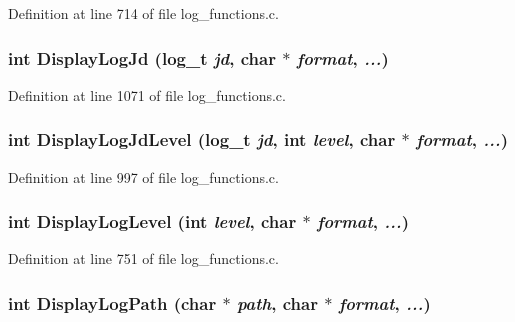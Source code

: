 Definition at line 714 of file log\_\-functions.c.
\subsubsection[{DisplayLogJd}]{\setlength{\rightskip}{0pt plus 5cm}int DisplayLogJd (log\_\-t {\em jd}, \/  char $\ast$ {\em format}, \/   {\em ...})}\label{log__functions_8c_cf6761c8fc977facc43ff1f3681801ab}




Definition at line 1071 of file log\_\-functions.c.
\subsubsection[{DisplayLogJdLevel}]{\setlength{\rightskip}{0pt plus 5cm}int DisplayLogJdLevel (log\_\-t {\em jd}, \/  int {\em level}, \/  char $\ast$ {\em format}, \/   {\em ...})}\label{log__functions_8c_6e6d118b08f82b3d19b2c469152e385a}




Definition at line 997 of file log\_\-functions.c.
\subsubsection[{DisplayLogLevel}]{\setlength{\rightskip}{0pt plus 5cm}int DisplayLogLevel (int {\em level}, \/  char $\ast$ {\em format}, \/   {\em ...})}\label{log__functions_8c_639bc4fc223d37c96acd78d9c8a25947}




Definition at line 751 of file log\_\-functions.c.
\subsubsection[{DisplayLogPath}]{\setlength{\rightskip}{0pt plus 5cm}int DisplayLogPath (char $\ast$ {\em path}, \/  char $\ast$ {\em format}, \/   {\em ...})}\label{log__functions_8c_e878d3843292099063322bfe3a913883}




